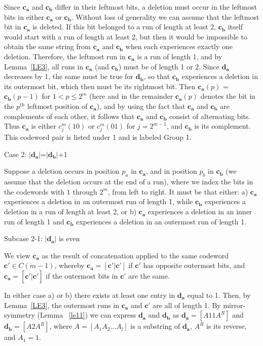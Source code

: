 Since $\mathbf{c_a}$ and $\mathbf{c_b}$ differ in their leftmost
bits, a deletion must occur in the leftmost bits in either
$\mathbf{c_a}$ or $\mathbf{c_b}$. Without loss of generality we
can assume that the leftmost bit in $\mathbf{c_a}$ is deleted. If
this bit belonged to a run of length at least 2, $\mathbf{c_b}$
itself would start with a run of length at least 2, but then it
would be impossible to obtain the same string from $\mathbf{c_a}$
and $\mathbf{c_b}$ when each experiences exactly one deletion.
Therefore, the leftmost run in $\mathbf{c_a}$ is a run of length
1, and by Lemma~\ref{LE3}, all runs in $\mathbf{c_a}$ (and
$\mathbf{c_b}$) must be of length 1 or 2. Since $\mathbf{d_a}$
decreases by 1, the same must be true for $\mathbf{d_b}$, so that
$\mathbf{c_b}$ experiences a deletion in its outermost bit, which
then must be its rightmost bit. Then $\mathbf{c_a}(p)$ =
$\mathbf{c_b}(p-1)$ for $1<p \leq 2^{m}$ (here and in the
remainder $\mathbf{c_a}(p)$ denotes the bit in the $p^{\text{th}}$
leftmost position of $\mathbf{c_a}$), and by using the fact that
$\mathbf{c_a}$ and $\mathbf{c_b}$ are complements of each other,
it follows that $\mathbf{c_a}$ and $\mathbf{c_b}$ consist of
alternating bits. Thus $\mathbf{c_a}$ is either $c_j^m(10)$ or
$c_j^m(01)$ for $j=2^{m-1}$, and $\mathbf{c_b}$ is its complement.
This codeword pair is listed under 1 and is labeled Group 1.

Case 2: $|\mathbf{d_a}|$=$|\mathbf{d_b}|$+1

Suppose a deletion occurs in position $p_a$ in $\mathbf{c_a}$, and
in position $p_b$ in $\mathbf{c_b}$ (we assume that the deletion
occurs at the end of a run), where we index the bits in the
codewords with $1$ through $2^m$, from left to right. It must be
that either: a) $\mathbf{c_a}$ experiences a deletion in an
outermost run of length 1, while $\mathbf{c_b}$ experiences a
deletion in a run of length at least 2, or b) $\mathbf{c_a}$
experiences a deletion in an inner run of length 1 and
$\mathbf{c_b}$ experiences a deletion in an outermost run of
length 1.

Subcase 2-1: $|\mathbf{d_a}|$ is even

We view $\mathbf{c_a}$ as the result of concatenation applied to
the same codeword $\mathbf{c'} \in C(m-1)$, whereby $\mathbf{c_a}=
[ \mathbf{c'} | \mathbf{c'}]$ if $\mathbf{c'}$ has opposite
outermost bits, and $\mathbf{c_a}= [ \mathbf{c'} |
\overline{\mathbf{c'}}]$ if the outermost bits in $\mathbf{c'}$
are the same.

In either case a) or b) there exists at least one entry in
$\mathbf{d_a}$ equal to 1. Then, by Lemma~\ref{LE3}, the outermost
runs in $\mathbf{c_a}$ and $\mathbf{c'}$ are all of length 1. By
mirror-symmetry (Lemma ~\ref{le11}) we can express $\mathbf{d_a}$
and $\mathbf{d_b}$ as $\mathbf{d_a}=[A11A^R]$ and
$\mathbf{d_b}=[A2A^R]$, where $A=[A_1 A_2 ... A_l]$ is a substring
of $\mathbf{d_a}$, $A^R$ is its reverse, and $A_1=1$.

